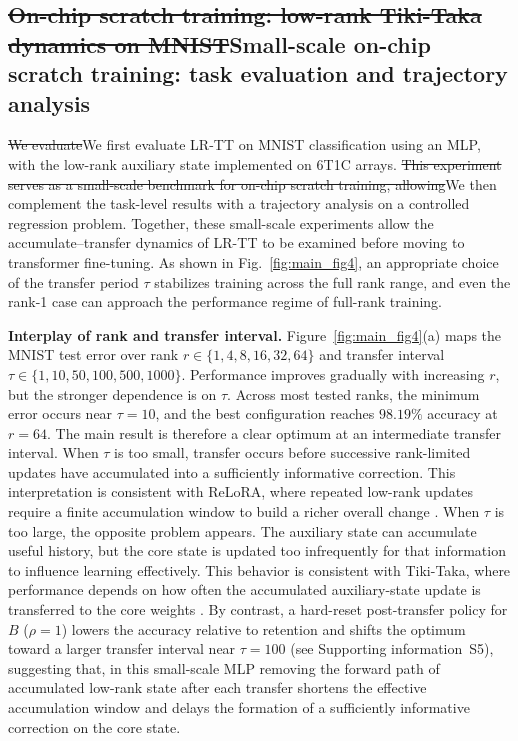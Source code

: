 \documentclass[AMA,LATO2COL]{WileyNJDv5}
\newcommand{\old}[1]{\sout{#1}}
\newcommand{\new}[1]{{\color{red}#1}}
\begin{document}
\subsection{\texorpdfstring{\old{On-chip scratch training: low-rank Tiki-Taka dynamics on MNIST}\new{Small-scale on-chip scratch training: task evaluation and trajectory analysis}}{Small-scale on-chip scratch training: task evaluation and trajectory analysis}}
\label{subsec:results_scratch}

\noindent
\old{We evaluate}\new{We first evaluate} LR-TT on MNIST classification \cite{lecun1998gradient} using an MLP, with the low-rank auxiliary state implemented on 6T1C arrays. \old{This experiment serves as a small-scale benchmark for on-chip scratch training, allowing}\new{We then complement the task-level results with a trajectory analysis on a controlled regression problem. Together, these small-scale experiments allow} the accumulate--transfer dynamics of LR-TT to be examined before moving to transformer fine-tuning. As shown in Fig.~\ref{fig:main_fig4}, an appropriate choice of the transfer period $\tau$ stabilizes training across the full rank range, and even the rank-1 case can approach the performance regime of full-rank training.

\noindent\textbf{Interplay of rank and transfer interval.}
Figure~\ref{fig:main_fig4}(a) maps the MNIST test error over rank $r\in\{1,4,8,16,32,64\}$ and transfer interval $\tau\in\{1,10,50,100,500,1000\}$. Performance improves gradually with increasing $r$, but the stronger dependence is on $\tau$. Across most tested ranks, the minimum error occurs near $\tau=10$, and the best configuration reaches \(98.19\%\) accuracy at \(r=64\). The main result is therefore a clear optimum at an intermediate transfer interval. When $\tau$ is too small, transfer occurs before successive rank-limited updates have accumulated into a sufficiently informative correction. This interpretation is consistent with ReLoRA, where repeated low-rank updates require a finite accumulation window to build a richer overall change \cite{lialin2023relora}. When $\tau$ is too large, the opposite problem appears. The auxiliary state can accumulate useful history, but the core state is updated too infrequently for that information to influence learning effectively. This behavior is consistent with Tiki-Taka, where performance depends on how often the accumulated auxiliary-state update is transferred to the core weights \cite{gokmen2020tikitaka,lee2022tikitaka_asymmetry,rasch2024fastrobust}. By contrast, a hard-reset post-transfer policy for $B$ ($\rho=1$) lowers the accuracy relative to retention and shifts the optimum toward a larger transfer interval near $\tau=100$ (see Supporting information~S5), suggesting that, in this small-scale MLP removing the forward path of accumulated low-rank state after each transfer shortens the effective accumulation window and delays the formation of a sufficiently informative correction on the core state.
\end{document}
